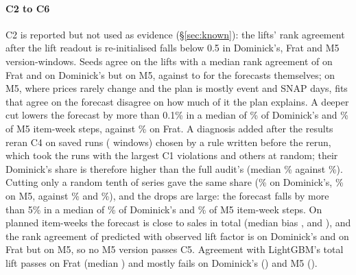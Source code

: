 \paragraph{C2 to C6}
C2 is reported but not used as evidence (\S\ref{sec:known}): the lifts' rank
agreement after the lift readout is re-initialised falls below 0.5 in
\rPassDCb{} Dominick's, \rPassFCb{} Frat and \rPassMCb{} M5 version-windows.
Seeds agree on the lifts with a median rank agreement of \rStabLiftF{} on Frat
and \rStabLiftD{} on Dominick's but \rStabLiftM{} on M5, against \rStabFcM{} to
\rStabFcF{} for the forecasts themselves; on M5, where prices rarely change and
the plan is mostly event and SNAP days, fits that agree on the forecast
disagree on how much of it the plan explains. A deeper cut lowers the forecast
by more than 0.1\% in a median of \rMedDCdPct\% of Dominick's and
\rMedMCdPct\% of M5 item-week steps, against \rMedFCdPct\% on Frat. A
diagnosis added after the results reran C4 on \dRuns{} saved runs
(\dWindows{} windows) chosen by a rule written before the rerun, which took
the runs with the largest C1 violations and others at random; their Dominick's
share is therefore higher than the full audit's (median \dCdAllD\% against
\rMedDCdPct\%). Cutting only a random tenth of series gave the same share
(\dCdTenthD\% on Dominick's, \dCdTenthM\% on M5, against \dCdAllD\% and
\dCdAllM\%), and the drops are large: the forecast falls by more than 5\% in a
median of \dCdBigD\% of Dominick's and \dCdBigM\% of M5 item-week steps. On
planned item-weeks the forecast is close to sales in total (median bias
\rMedDCeBias, \rMedFCeBias{} and \rMedMCeBias), and the rank agreement of
predicted with observed lift factor is \rMedDCeRank{} on Dominick's and
\rMedFCeRank{} on Frat but \rMedMCeRank{} on M5, so no M5 version passes C5.
Agreement with LightGBM's total lift passes on Frat (median \rMedFCf) and
mostly fails on Dominick's (\rMedDCf) and M5 (\rMedMCf).


